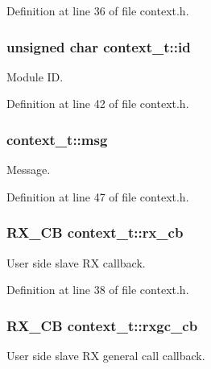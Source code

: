 \-Definition at line 36 of file context.\-h.

\hypertarget{structcontext__t_afcfccef1ae4111aee136acf0d92b4379}{
\subsubsection[{id}]{\setlength{\rightskip}{0pt plus 5cm}unsigned char {\bf context\-\_\-t\-::id}}}\label{structcontext__t_afcfccef1ae4111aee136acf0d92b4379}
\-Module \-I\-D. 

\-Definition at line 42 of file context.\-h.

\hypertarget{structcontext__t_ae806cd53ff68971d122ab6f854d22b8d}{
\subsubsection[{msg}]{ {\bf context\-\_\-t\-::msg}}}\label{structcontext__t_ae806cd53ff68971d122ab6f854d22b8d}
\-Message. 

\-Definition at line 47 of file context.\-h.

\hypertarget{structcontext__t_a9d4451da3b62a2ec269ae7fd2f6b24b8}{
\subsubsection[{rx\-\_\-cb}]{\setlength{\rightskip}{0pt plus 5cm}\-R\-X\-\_\-\-C\-B {\bf context\-\_\-t\-::rx\-\_\-cb}}}\label{structcontext__t_a9d4451da3b62a2ec269ae7fd2f6b24b8}
\-User side slave \-R\-X callback. 

\-Definition at line 38 of file context.\-h.

\hypertarget{structcontext__t_a108cbe016d12bac90d1582ed0cca91e8}{
\subsubsection[{rxgc\-\_\-cb}]{\setlength{\rightskip}{0pt plus 5cm}\-R\-X\-\_\-\-C\-B {\bf context\-\_\-t\-::rxgc\-\_\-cb}}}\label{structcontext__t_a108cbe016d12bac90d1582ed0cca91e8}
\-User side slave \-R\-X general call callback. 

